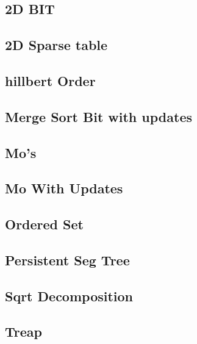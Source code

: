 \subsection{2D BIT}
\raggedbottom
\hrulefill
\subsection{2D Sparse table}
\raggedbottom
\hrulefill
\subsection{hillbert Order}
\raggedbottom
\hrulefill
\subsection{Merge Sort Bit with updates}
\raggedbottom
\hrulefill
\subsection{Mo's}
\raggedbottom
\hrulefill
\subsection{Mo With Updates}
\raggedbottom
\hrulefill
\subsection{Ordered Set}
\raggedbottom
\hrulefill
\subsection{Persistent Seg Tree}
\raggedbottom
\hrulefill
\subsection{Sqrt Decomposition}
\raggedbottom
\hrulefill
\subsection{Treap}
\raggedbottom
\hrulefill
